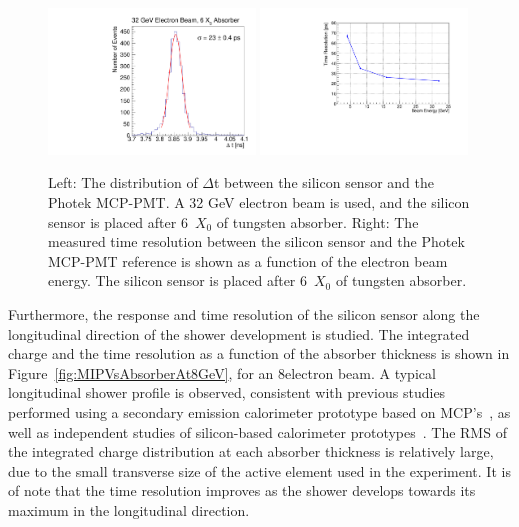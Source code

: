 \begin{figure}[h] 
\centering
\includegraphics[width=0.49\textwidth]{plots/deltaT_32GeV_6X0.pdf} 
\includegraphics[width=0.49\textwidth]{plots/SigmaT_vs_BeamEnergy_lin30Stamp.pdf} 
\caption{Left: The distribution of $\Delta$t between the silicon sensor and the
Photek MCP-PMT. A 32 GeV electron beam is used, and the silicon sensor is placed
after 6~$X_0$ of tungsten absorber. Right: The measured time resolution between
the silicon sensor and the Photek MCP-PMT reference is shown as a function of
the electron beam energy. The silicon sensor is placed after 6~$X_0$ of
tungsten absorber. } 
\label{fig:MIPVsEnergy} 
\end{figure} 
Furthermore, the response and time resolution of the silicon sensor
along the longitudinal direction of the shower development is studied. The
integrated charge and the time resolution as a function of the absorber
thickness is shown in Figure~\ref{fig:MIPVsAbsorberAt8GeV}, for
an 8\GeV electron beam. A typical longitudinal shower profile is
observed, consistent with previous studies performed using a secondary emission
calorimeter prototype based on MCP's~\cite{Ronzhin2015288}, as well as
independent studies of silicon-based calorimeter prototypes~\cite{Muhuri201424}.
The RMS of the integrated charge distribution at each absorber thickness is
relatively large, due to the small transverse size of the active element used in
the experiment. It is of note that the time resolution improves as the shower
develops towards its maximum in the longitudinal direction. 
